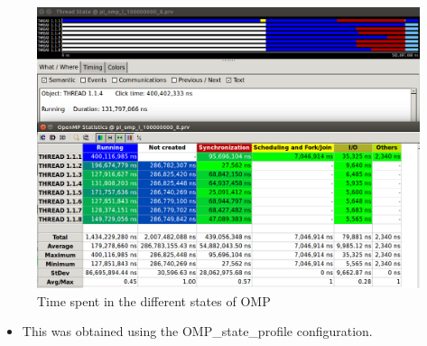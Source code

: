 \documentclass[12pt]{article}
\begin{document}
\begin{enumerate}
\begin{figure}[H]
\centering
\includegraphics[width=15cm]{ex9.png}
\caption{Time spent in the different states of OMP}
\label{fig:Parallel duration}%
\end{figure}

\begin{itemize}
	\item[] This was obtained using the OMP\_state\_profile configuration. 
\end{itemize}


\end{enumerate}
\end{document}
